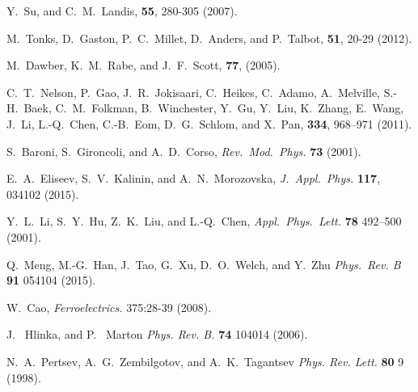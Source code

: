 \documentclass[22pt]{article} %
\begin{document}
\begin{thebibliography}{1}
Y.~Su, and C.~M.~Landis,
 \textbf{55}, 280-305 (2007).

M.~Tonks, D.~Gaston, P.~C.~Millet, D.~Anders, and P.~Talbot,
 \textbf{51}, 20-29 (2012).

M.~Dawber, K.~M.~Rabe, and J.~F.~Scott,
 \textbf{77}, (2005).

C.~T.~Nelson, P.~Gao, J.~R.~Jokisaari, C.~Heikes, C.~Adamo, A.~Melville, S.-H.~Baek, C.~M.~Folkman, B.~Winchester, Y.~Gu, Y.~Liu, K.~Zhang, 
E.~Wang, J.~Li, L.-Q.~Chen, C.-B.~Eom, D.~G.~Schlom, and X.~Pan,
 \textbf{334}, 968--971 (2011).

S.~Baroni, S.~Gironcoli, and A.~D.~Corso,
\newblock \emph{Rev.~Mod.~Phys.} \textbf{73} (2001).

E.~A.~Eliseev, S.~V.~Kalinin, and A.~N.~Morozovska,
\newblock \emph{J.~Appl.~Phys.} \textbf{117}, 034102 (2015).

Y.~L.~Li, S.~Y.~Hu, Z.~K.~Liu, and L.-Q.~Chen,
\newblock \emph{Appl.~Phys.~Lett.} \textbf{78} 492--500 (2001).

Q.~Meng, M.-G.~Han, J.~Tao, G.~Xu, D.~O.~Welch, and Y.~Zhu
\newblock \emph{Phys.~Rev. B} \textbf{91} 054104 (2015).

W.~Cao,
\newblock \emph{Ferroelectrics.} 375:28-39 (2008).

J. ~Hlinka, and P. ~Marton
\newblock \emph{Phys. Rev. B.} \textbf{74} 104014 (2006).

N.~A.~Pertsev, A.~G.~Zembilgotov, and A.~K.~Tagantsev
\newblock \emph{Phys. Rev. Lett.} \textbf{80} 9 (1998).


\end{thebibliography}
\end{document}
